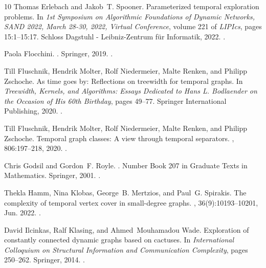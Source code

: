 \documentclass[10pt,a4paper]{article}
\begin{document}
\begin{thebibliography}{10}
Thomas Erlebach and Jakob~T. Spooner.
\newblock Parameterized temporal exploration problems.
\newblock In {\em 1st Symposium on Algorithmic Foundations of Dynamic Networks,
  {SAND} 2022, March 28-30, 2022, Virtual Conference}, volume 221 of {\em
  LIPIcs}, pages 15:1--15:17. Schloss Dagstuhl - Leibniz-Zentrum f{\"{u}}r
  Informatik, 2022.
\newblock \href {https://doi.org/10.4230/LIPIcs.SAND.2022.15}
  {}.

Paola Flocchini.
.
\newblock Springer, 2019.
\newblock \href {https://doi.org/10.1007/978-3-030-11072-7}
  {}.

Till Fluschnik, Hendrik Molter, Rolf Niedermeier, Malte Renken, and Philipp
  Zschoche.
\newblock As time goes by: Reflections on treewidth for temporal graphs.
\newblock In {\em Treewidth, Kernels, and Algorithms: Essays Dedicated to Hans
  L. Bodlaender on the Occasion of His 60th Birthday}, pages 49--77. Springer
  International Publishing, 2020.
\newblock \href {https://doi.org/10.1007/978-3-030-42071-0_6}
  {}.

Till Fluschnik, Hendrik Molter, Rolf Niedermeier, Malte Renken, and Philipp
  Zschoche.
\newblock Temporal graph classes: A view through temporal separators.
, 806:197--218, 2020.
\newblock \href {https://doi.org/10.1016/j.tcs.2019.03.031}
  {}.

Chris Godsil and Gordon~F. Royle.
.
\newblock Number Book 207 in Graduate Texts in Mathematics. Springer, 2001.
\newblock \href {https://doi.org/10.1007/978-1-4613-0163-9}
  {}.

Thekla Hamm, Nina Klobas, George~B. Mertzios, and Paul~G. Spirakis.
\newblock The complexity of temporal vertex cover in small-degree graphs.
,
  36(9):10193--10201, Jun. 2022.
\newblock \href {https://doi.org/10.1609/aaai.v36i9.21259}
  {}.

David Ilcinkas, Ralf Klasing, and Ahmed~Mouhamadou Wade.
\newblock Exploration of constantly connected dynamic graphs based on cactuses.
\newblock In {\em International Colloquium on Structural Information and
  Communication Complexity}, pages 250--262. Springer, 2014.
\newblock \href {https://doi.org/10.1007/978-3-319-09620-9_20}
  {}.


\end{thebibliography}
\end{document}
